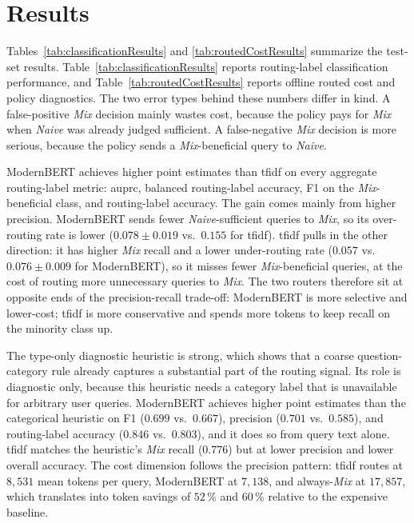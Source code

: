 \documentclass[english, bibtex]{kththesis}               %
\numberwithin{listing}{chapter}
\begin{document}
\section{Results}
\label{sec:implResults}

Tables~\ref{tab:classificationResults} and \ref{tab:routedCostResults} summarize the test-set results. Table~\ref{tab:classificationResults} reports routing-label classification performance, and Table~\ref{tab:routedCostResults} reports offline routed cost and policy diagnostics. The two error types behind these numbers differ in kind. A false-positive \emph{Mix} decision mainly wastes cost, because the policy pays for \emph{Mix} when \emph{Naive} was already judged sufficient. A false-negative \emph{Mix} decision is more serious, because the policy sends a \emph{Mix}-beneficial query to \emph{Naive}.

ModernBERT achieves higher point estimates than \gls{tfidf} on every aggregate routing-label metric: \gls{auprc}, balanced routing-label accuracy, F1 on the \emph{Mix}-beneficial class, and routing-label accuracy. The gain comes mainly from higher precision. ModernBERT sends fewer \emph{Naive}-sufficient queries to \emph{Mix}, so its over-routing rate is lower ($0.078 \pm 0.019$ vs.\ $0.155$ for \gls{tfidf}). \gls{tfidf} pulls in the other direction: it has higher \emph{Mix} recall and a lower under-routing rate ($0.057$ vs.\ $0.076 \pm 0.009$ for ModernBERT), so it misses fewer \emph{Mix}-beneficial queries, at the cost of routing more unnecessary queries to \emph{Mix}. The two routers therefore sit at opposite ends of the precision-recall trade-off: ModernBERT is more selective and lower-cost; \gls{tfidf} is more conservative and spends more tokens to keep recall on the minority class up.

The type-only diagnostic heuristic is strong, which shows that a coarse question-category rule already captures a substantial part of the routing signal. Its role is diagnostic only, because this heuristic needs a category label that is unavailable for arbitrary user queries. ModernBERT achieves higher point estimates than the categorical heuristic on F1 ($0.699$ vs.\ $0.667$), precision ($0.701$ vs.\ $0.585$), and routing-label accuracy ($0.846$ vs.\ $0.803$), and it does so from query text alone. \gls{tfidf} matches the heuristic's \emph{Mix} recall ($0.776$) but at lower precision and lower overall accuracy. The cost dimension follows the precision pattern: \gls{tfidf} routes at $8{,}531$ mean tokens per query, ModernBERT at $7{,}138$, and always-\emph{Mix} at $17{,}857$, which translates into token savings of $52\,\%$ and $60\,\%$ relative to the expensive baseline.
\end{document}
